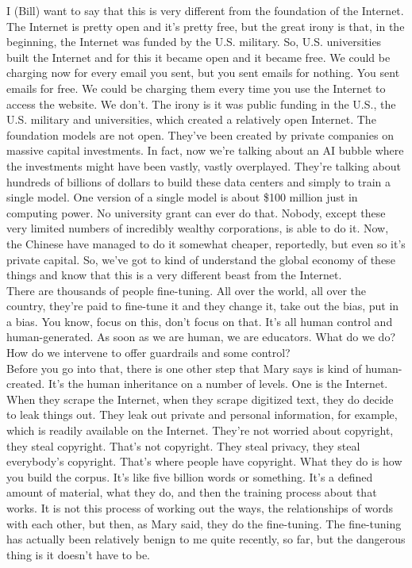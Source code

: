 \documentclass[english]{textolivre}
\begin{document}
{    I (Bill) want to say that this is very different from the foundation of the Internet. The Internet is pretty open and it’s pretty free, but the great irony is that, in the beginning, the Internet was funded by the U.S. military. So, U.S. universities built the Internet and for this it became open and it became free. We could be charging now for every email you sent, but you sent emails for nothing. You sent emails for free. We could be charging them every time you use the Internet to access the website. We don’t. The irony is it was public funding in the U.S., the U.S. military and universities, which created a relatively open Internet. The foundation models are not open. They’ve been created by private companies on massive capital investments. In fact, now we’re talking about an AI bubble where the investments might have been vastly, vastly overplayed. They’re talking about hundreds of billions of dollars to build these data centers and simply to train a single model. One version of a single model is about \$100 million just in computing power. No university grant can ever do that. Nobody, except these very limited numbers of incredibly wealthy corporations, is able to do it. Now, the Chinese have managed to do it somewhat cheaper, reportedly, but even so it’s private capital. So, we’ve got to kind of understand the global economy of these things and know that this is a very different beast from the Internet.\\
    There are thousands of people fine-tuning. All over the world, all over the country, they’re paid to fine-tune it and they change it, take out the bias, put in a bias. You know, focus on this, don’t focus on that. It’s all human control and human-generated. As soon as we are human, we are educators. What do we do? How do we intervene to offer guardrails and some control?\\
    Before you go into that, there is one other step that Mary says is kind of human-created. It’s the human inheritance on a number of levels. One is the Internet. When they scrape the Internet, when they scrape digitized text, they do decide to leak things out. They leak out private and personal information, for example, which is readily available on the Internet. They’re not worried about copyright, they steal copyright. That’s not copyright. They steal privacy, they steal everybody’s copyright. That’s where people have copyright. What they do is how you build the corpus. It’s like five billion words or something. It’s a defined amount of material, what they do, and then the training process about that works. It is not this process of working out the ways, the relationships of words with each other, but then, as Mary said, they do the fine-tuning. The fine-tuning has actually been relatively benign to me quite recently, so far, but the dangerous thing is it doesn’t have to be.\\
}
\end{document}
